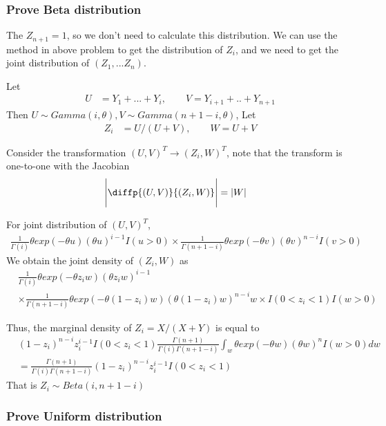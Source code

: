 \subsubsection{Prove Beta distribution}
The $Z_{n+1} = 1$, so we don't need to calculate this distribution. 
We can use the method in above problem to get the distribution of $Z_i$, and we need to get the joint distribution of $(Z_1, ... Z_n)$.

Let 
\begin{align*}
	U &=Y_1 + ...+ Y_i, \qquad V= Y_{i+1}+ .. + Y_{n+1} 
\end{align*}
Then $U \sim Gamma(i, \theta), V \sim Gamma(n+1-i, \theta)$, Let
\begin{align*}
 	Z_i &= U/(U+V), \qquad W = U+V 
\end{align*}

Consider the transformation $(U,V)^T \rightarrow (Z_i, W)^T$, note that the transform is one-to-one with the Jacobian
\begin{align*}
	\Bigg |\diffp{(U,V)}{{(Z_i, W)}} \Bigg | &= |W|
\end{align*}
 
For joint distribution of  $(U,V)^T$, 
\begin{align*}
	\frac{1}{\Gamma{(i)}} \theta exp(-\theta u) (\theta u)^{i-1} I(u > 0) \times \frac{1}{\Gamma{(n+1-i)}} \theta exp(-\theta v) (\theta v)^{n-i} I(v > 0)
\end{align*}
We obtain the joint density of $(Z_i, W)$ as 
\begin{align*}
&	\frac{1}{\Gamma{(i)}} \theta exp(-\theta z_i w) (\theta z_i w)^{i-1} \\
	& \times \frac{1}{\Gamma{(n+1-i)}} \theta exp(-\theta (1-z_i) w) (\theta (1-z_i) w)^{n-i} w \times I(0< z_i< 1) I(w > 0)
\end{align*}

Thus, the marginal density of $Z_i = X/(X+Y)$ is equal to
\begin{align*}
 & (1-z_i)^{n-i} z_i^{i-1} I(0< z_i <1)	\frac{\Gamma(n+1)}{\Gamma(i) \Gamma(n+1-i)} \int_{w} \theta exp(-\theta w) (\theta w)^n I(w>0) 	dw \\
 &= \frac{\Gamma(n+1)}{\Gamma(i) \Gamma(n+1-i)} (1-z_i)^{n-i} z_i^{i-1} I(0< z_i <1)
\end{align*}
That is $Z_i \sim Beta(i, n+1-i)$

\subsubsection{Prove Uniform distribution}




